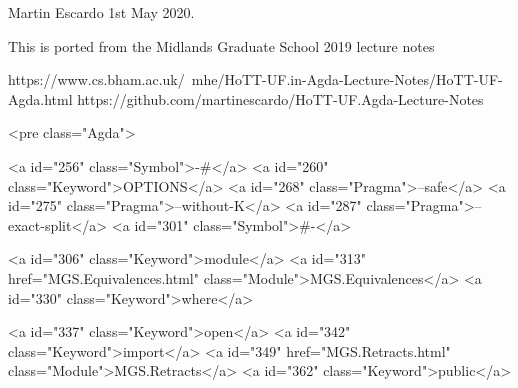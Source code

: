 Martin Escardo 1st May 2020.

This is ported from the Midlands Graduate School 2019 lecture notes

 https://www.cs.bham.ac.uk/~mhe/HoTT-UF.in-Agda-Lecture-Notes/HoTT-UF-Agda.html
 https://github.com/martinescardo/HoTT-UF.Agda-Lecture-Notes

<pre class="Agda">

<a id="256" class="Symbol">{-#</a> <a id="260" class="Keyword">OPTIONS</a> <a id="268" class="Pragma">--safe</a> <a id="275" class="Pragma">--without-K</a> <a id="287" class="Pragma">--exact-split</a> <a id="301" class="Symbol">#-}</a>

<a id="306" class="Keyword">module</a> <a id="313" href="MGS.Equivalences.html" class="Module">MGS.Equivalences</a> <a id="330" class="Keyword">where</a>

<a id="337" class="Keyword">open</a> <a id="342" class="Keyword">import</a> <a id="349" href="MGS.Retracts.html" class="Module">MGS.Retracts</a> <a id="362" class="Keyword">public</a>

